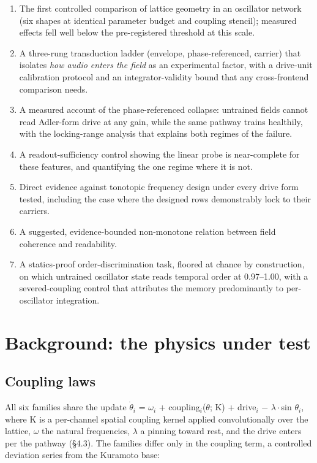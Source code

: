 \documentclass[10pt]{article}
\makeatletter
\providecommand{\tightlist}{%
  \setlength{\itemsep}{0pt}\setlength{\parskip}{0pt}}
\newcommand{\tmlr@floatbarrier}{\par\vspace{\z@}%
  \ifx\@deferlist\@empty\else\clearpage\fi}
\let\tmlr@section\section
\renewcommand{\section}{\tmlr@floatbarrier\tmlr@section}
\makeatother
\begin{document}
\begin{enumerate}
\def\labelenumi{\arabic{enumi}.}
\tightlist
\item
  The first controlled comparison of lattice geometry in an oscillator
  network (six shapes at identical parameter budget and coupling
  stencil); measured effects fell well below the pre-registered
  threshold at this scale.
\item
  A three-rung transduction ladder (envelope, phase-referenced, carrier)
  that isolates \emph{how audio enters the field} as an experimental
  factor, with a drive-unit calibration protocol and an
  integrator-validity bound that any cross-frontend comparison needs.
\item
  A measured account of the phase-referenced collapse: untrained fields
  cannot read Adler-form drive at any gain, while the same pathway
  trains healthily, with the locking-range analysis that explains both
  regimes of the failure.
\item
  A readout-sufficiency control showing the linear probe is
  near-complete for these features, and quantifying the one regime where
  it is not.
\item
  Direct evidence against tonotopic frequency design under every drive
  form tested, including the case where the designed rows demonstrably
  lock to their carriers.
\item
  A suggested, evidence-bounded non-monotone relation between field
  coherence and readability.
\item
  A statics-proof order-discrimination task, floored at chance by
  construction, on which untrained oscillator state reads temporal order
  at 0.97--1.00, with a severed-coupling control that attributes the
  memory predominantly to per-oscillator integration.
\end{enumerate}

\section{Background: the physics under
test}\label{background-the-physics-under-test}

\subsection{Coupling laws}\label{coupling-laws}

All six families share the update \ensuremath{\dot{\theta}_{i}} =
\ensuremath{\omega_{i}} + coupling\ensuremath{_{i}}(\ensuremath{\theta};
K) + drive\ensuremath{_{i}} \ensuremath{-} \ensuremath{\lambda\cdot}sin
\ensuremath{\theta_{i}}, where K is a per-channel spatial coupling
kernel applied convolutionally over the lattice, \ensuremath{\omega} the
natural frequencies, \ensuremath{\lambda} a pinning toward rest, and the
drive enters per the pathway (§4.3). The families differ only in the
coupling term, a controlled deviation series from the Kuramoto base:
\end{document}
